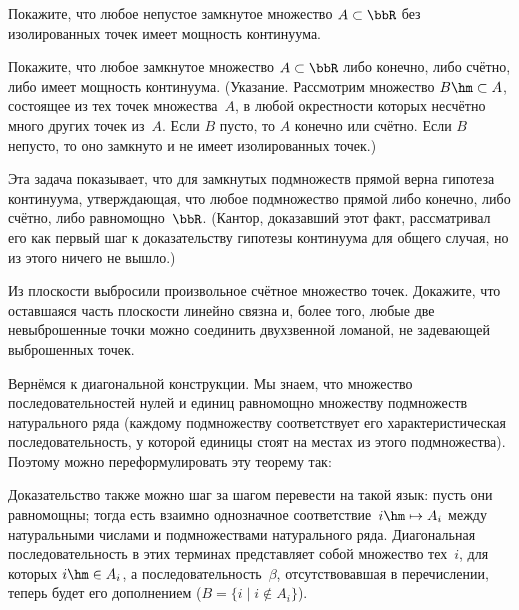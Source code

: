 \begin{problem}
Покажите, что любое непустое замкнутое множество $A\subset\bbR$ без
изолированных точек имеет мощность континуума.
\end{problem}

\begin{problem}
Покажите, что любое замкнутое множество $A\subset\bbR$ либо
конечно, либо счётно, либо имеет мощность континуума. (Указание.
Рассмотрим множество $B\hm\subset A$, состоящее из тех
точек множества~$A$, в любой окрестности которых несчётно много
других точек из~$A$. Если $B$ пусто, то $A$ конечно или счётно.
Если $B$ непусто, то оно замкнуто и не имеет изолированных
точек.)
\end{problem}

Эта задача показывает, что для замкнутых подмножеств прямой
верна гипотеза континуума, утверждающая,
что любое подмножество
прямой либо конечно, либо счётно, либо равномощно~$\bbR$.
(Кантор, доказавший этот факт,
рассматривал его как первый шаг к доказательству гипотезы
континуума для общего случая, но из этого ничего не вышло.)

\begin{problem}
Из плоскости выбросили произвольное счётное множество точек.
Докажите, что оставшаяся часть плоскости линейно связна и, более
того, любые две невыброшенные точки можно соединить двухзвенной
ломаной, не задевающей выброшенных точек.
\end{problem}

Вернёмся к диагональной конструкции.
Мы знаем, что множество последовательностей нулей и единиц
равномощно множеству подмножеств натурального ряда (каждому
подмножеству соответствует его  характеристическая
последовательность, у которой единицы стоят на местах из
этого подмножества). Поэтому можно переформулировать эту
теорему так:


\noindent
Доказательство также можно шаг за шагом перевести на такой язык:
пусть они равномощны; тогда есть взаимно однозначное
соответствие~$i\hm\mapsto A_i$ между натуральными числами и
подмножествами натурального ряда. Диагональная
последовательность в этих терминах представляет собой множество
тех~$i$, для которых $i\hm\in A_i$, а
последовательность~$\beta$, отсутствовавшая в перечислении,
теперь будет его дополнением ($B=\{i \mid i \notin A_i\}$).

